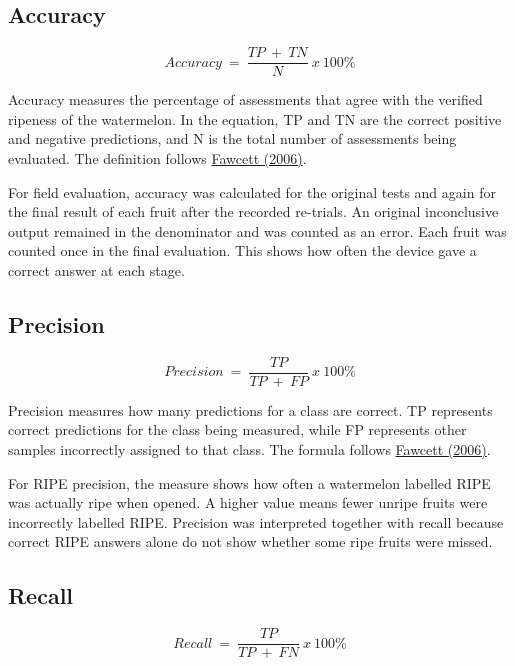 \begin{thesisprose}
\subsection{Accuracy}

\begin{equation}
  Accuracy\  = \ \frac{TP\  + \ TN}{N}\ x\ 100\%
  \label{eq:formula-599}
\end{equation}

Accuracy measures the percentage of assessments that agree with the verified ripeness of the watermelon. In the equation, TP and TN are the correct positive and negative predictions, and N is the total number of assessments being evaluated. The definition follows \hyperlink{cite.fawcett2006}{Fawcett (2006)}.

For field evaluation, accuracy was calculated for the original tests and again for the final result of each fruit after the recorded re-trials. An original inconclusive output remained in the denominator and was counted as an error. Each fruit was counted once in the final evaluation. This shows how often the device gave a correct answer at each stage.

\subsection{Precision}

\begin{equation}
  Precision\  = \ \frac{TP}{TP\  + \ FP}\ x\ 100\%
  \label{eq:formula-603}
\end{equation}

Precision measures how many predictions for a class are correct. TP represents correct predictions for the class being measured, while FP represents other samples incorrectly assigned to that class. The formula follows \hyperlink{cite.fawcett2006}{Fawcett (2006)}.

For RIPE precision, the measure shows how often a watermelon labelled RIPE was actually ripe when opened. A higher value means fewer unripe fruits were incorrectly labelled RIPE. Precision was interpreted together with recall because correct RIPE answers alone do not show whether some ripe fruits were missed.

\subsection{Recall}

\begin{equation}
  Recall\  = \ \frac{TP}{TP\  + \ FN}\ x\ 100\%
  \label{eq:formula-607}
\end{equation}


\end{thesisprose}
